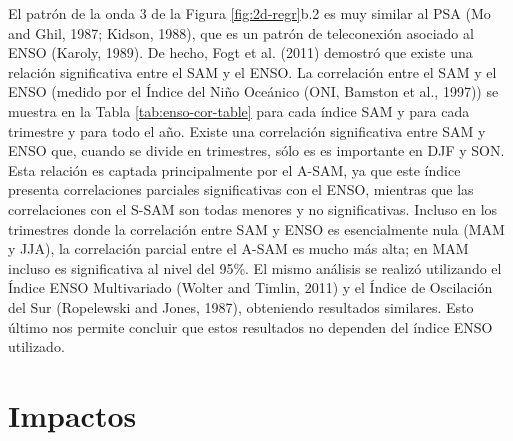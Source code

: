 \documentclass[12pt,oneside]{reedthesis}
\begin{document}
El patrón de la onda 3 de la Figura \ref{fig:2d-regr}b.2 es muy similar al PSA (Mo and Ghil, 1987; Kidson, 1988), que es un patrón de teleconexión asociado al ENSO (Karoly, 1989).
De hecho, Fogt et al. (2011) demostró que existe una relación significativa entre el SAM y el ENSO.
La correlación entre el SAM y el ENSO (medido por el Índice del Niño Oceánico (ONI, Bamston et al., 1997)) se muestra en la Tabla \ref{tab:enso-cor-table} para cada índice SAM y para cada trimestre y para todo el año.
Existe una correlación significativa entre SAM y ENSO que, cuando se divide en trimestres, sólo es es importante en DJF y SON.
Esta relación es captada principalmente por el A-SAM, ya que este índice presenta correlaciones parciales significativas con el ENSO, mientras que las correlaciones con el S-SAM son todas menores y no significativas.
Incluso en los trimestres donde la correlación entre SAM y ENSO es esencialmente nula (MAM y JJA), la correlación parcial entre el A-SAM es mucho más alta; en MAM incluso es significativa al nivel del 95\%.
El mismo análisis se realizó utilizando el Índice ENSO Multivariado (Wolter and Timlin, 2011) y el Índice de Oscilación del Sur (Ropelewski and Jones, 1987), obteniendo resultados similares.
Esto último nos permite concluir que estos resultados no dependen del índice ENSO utilizado.

\hypertarget{impacts}{%
\section{Impactos}\label{impacts}}
\end{document}
